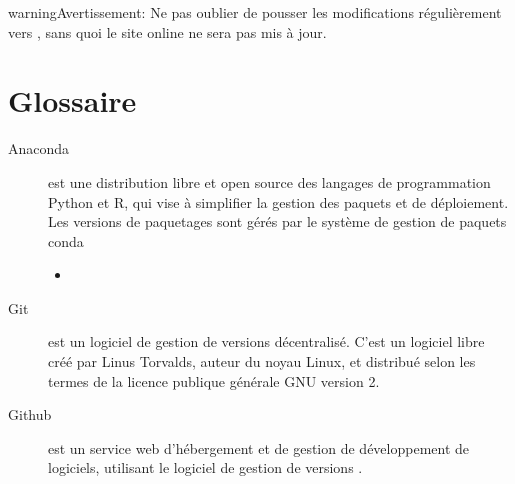 \documentclass[letterpaper,10pt,french]{sphinxmanual}
\begin{document}
\begin{sphinxadmonition}{warning}{Avertissement:}
Ne pas oublier de pousser les modifications régulièrement vers {\hyperref[\detokenize{readthedocs/glossary:term-github}]{}}, sans quoi le site online ne sera pas mis à jour.
\end{sphinxadmonition}


\section{Glossaire}
\label{\detokenize{readthedocs/glossary:glossaire}}\label{\detokenize{readthedocs/glossary:glossary}}\label{\detokenize{readthedocs/glossary::doc}}\begin{description}
\item[{Anaconda\label{\detokenize{readthedocs/glossary:term-anaconda}}}] \leavevmode
{} est une distribution libre et open source des langages de programmation Python et R, qui vise à simplifier la gestion des paquets et de déploiement. Les versions de paquetages sont gérés par le système de gestion de paquets conda



\begin{itemize}
\item {} 

\end{itemize}



\item[{Git\label{\detokenize{readthedocs/glossary:term-git}}}] \leavevmode
{} est un logiciel de gestion de versions décentralisé. C’est un logiciel libre créé par Linus Torvalds, auteur du noyau Linux, et distribué selon les termes de la licence publique générale GNU version 2.

\item[{Github\label{\detokenize{readthedocs/glossary:term-github}}}] \leavevmode
{} est un service web d’hébergement et de gestion de développement de logiciels, utilisant le logiciel de gestion de versions {\hyperref[\detokenize{readthedocs/glossary:term-git}]{}}.


\end{description}
\end{document}
